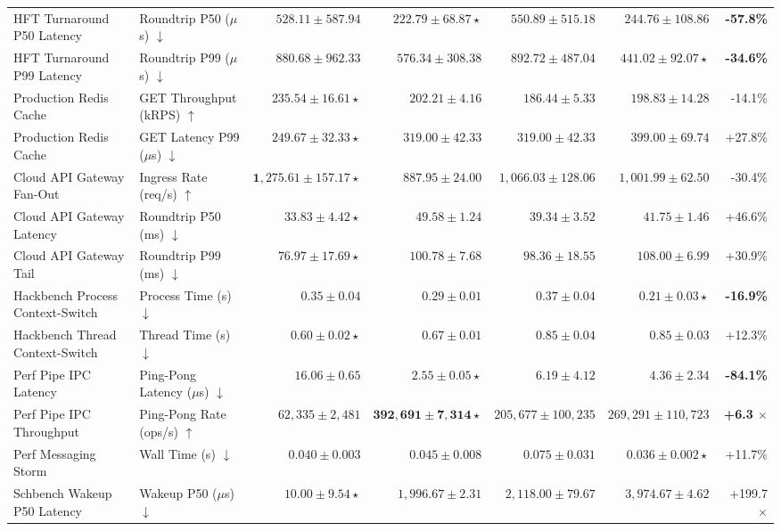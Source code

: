 \documentclass[letterpaper,twocolumn,10pt]{article}
\begin{document}
\begin{table}[t!]
{\begin{tabular}{llrrrrr}
HFT Turnaround P50 Latency & Roundtrip P50 ($\mu$s) $\downarrow$ & $528.11 \pm 587.94$ & $\mathbf{222.79 \pm 68.87} \star$ & $550.89 \pm 515.18$ & $244.76 \pm 108.86$ & \textbf{-57.8\%} \\
HFT Turnaround P99 Latency & Roundtrip P99 ($\mu$s) $\downarrow$ & $880.68 \pm 962.33$ & $576.34 \pm 308.38$ & $892.72 \pm 487.04$ & $\mathbf{441.02 \pm 92.07} \star$ & \textbf{-34.6\%} \\
Production Redis Cache & GET Throughput (kRPS) $\uparrow$ & $\mathbf{235.54 \pm 16.61} \star$ & $202.21 \pm 4.16$ & $186.44 \pm 5.33$ & $198.83 \pm 14.28$ & -14.1\% \\
Production Redis Cache & GET Latency P99 ($\mu$s) $\downarrow$ & $\mathbf{249.67 \pm 32.33} \star$ & $319.00 \pm 42.33$ & $319.00 \pm 42.33$ & $399.00 \pm 69.74$ & +27.8\% \\
Cloud API Gateway Fan-Out & Ingress Rate (req/s) $\uparrow$ & $\mathbf{1{,}275.61 \pm 157.17} \star$ & $887.95 \pm 24.00$ & $1{,}066.03 \pm 128.06$ & $1{,}001.99 \pm 62.50$ & -30.4\% \\
Cloud API Gateway Latency & Roundtrip P50 (ms) $\downarrow$ & $\mathbf{33.83 \pm 4.42} \star$ & $49.58 \pm 1.24$ & $39.34 \pm 3.52$ & $41.75 \pm 1.46$ & +46.6\% \\
Cloud API Gateway Tail & Roundtrip P99 (ms) $\downarrow$ & $\mathbf{76.97 \pm 17.69} \star$ & $100.78 \pm 7.68$ & $98.36 \pm 18.55$ & $108.00 \pm 6.99$ & +30.9\% \\
Hackbench Process Context-Switch & Process Time (s) $\downarrow$ & $0.35 \pm 0.04$ & $0.29 \pm 0.01$ & $0.37 \pm 0.04$ & $\mathbf{0.21 \pm 0.03} \star$ & \textbf{-16.9\%} \\
Hackbench Thread Context-Switch & Thread Time (s) $\downarrow$ & $\mathbf{0.60 \pm 0.02} \star$ & $0.67 \pm 0.01$ & $0.85 \pm 0.04$ & $0.85 \pm 0.03$ & +12.3\% \\
Perf Pipe IPC Latency & Ping-Pong Latency ($\mu$s) $\downarrow$ & $16.06 \pm 0.65$ & $\mathbf{2.55 \pm 0.05} \star$ & $6.19 \pm 4.12$ & $4.36 \pm 2.34$ & \textbf{-84.1\%} \\
Perf Pipe IPC Throughput & Ping-Pong Rate (ops/s) $\uparrow$ & $62{,}335 \pm 2{,}481$ & $\mathbf{392{,}691 \pm 7{,}314} \star$ & $205{,}677 \pm 100{,}235$ & $269{,}291 \pm 110{,}723$ & \textbf{+6.3 $\times$} \\
Perf Messaging Storm & Wall Time (s) $\downarrow$ & $0.040 \pm 0.003$ & $0.045 \pm 0.008$ & $0.075 \pm 0.031$ & $\mathbf{0.036 \pm 0.002} \star$ & +11.7\% \\
Schbench Wakeup P50 Latency & Wakeup P50 ($\mu$s) $\downarrow$ & $\mathbf{10.00 \pm 9.54} \star$ & $1{,}996.67 \pm 2.31$ & $2{,}118.00 \pm 79.67$ & $3{,}974.67 \pm 4.62$ & +199.7 $\times$ \\

\end{tabular}}
\end{table}
\end{document}
